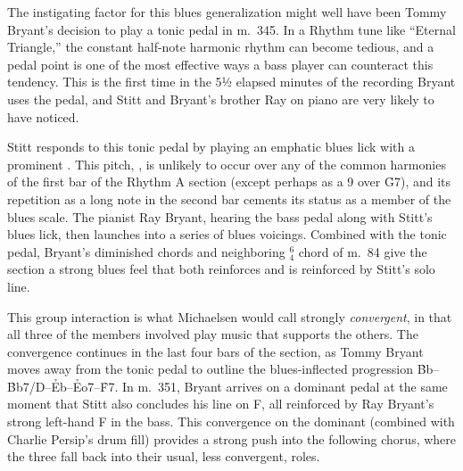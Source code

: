The instigating factor for this blues generalization might well have been
Tommy Bryant's decision to play a tonic pedal in m.~345. In a Rhythm tune like
``Eternal Triangle,'' the constant half-note harmonic rhythm can become
tedious, and a pedal point is one of the most effective ways a bass player can
counteract this tendency. This is the first time in the 5½ elapsed minutes of the
recording Bryant uses the pedal, and Stitt and Bryant's brother Ray on piano
are very likely to have noticed.

Stitt responds to this tonic pedal by playing an emphatic blues lick with a
prominent \Aflat. This pitch, \flat{}, is unlikely to occur over
any of the common harmonies of the first bar of the Rhythm A section (except
perhaps as a \flat{}9 over \h{G7}), and its repetition as a long note in the
second bar cements its status as a member of the \Bflat blues scale. The
pianist Ray Bryant, hearing the bass pedal along with Stitt's blues lick, then
launches into a series of blues voicings. Combined with the tonic pedal,
Bryant's diminished chords and neighboring $^6_4$ chord of m.~84 give the
section a strong blues feel that both reinforces and is reinforced by Stitt's
solo line.

This group interaction is what Michaelsen would call strongly
\emph{convergent}, in that all three of the members involved play music that
supports the others. The convergence continues in the last four bars
of the section, as Tommy Bryant moves away from the tonic pedal to outline the
blues-inflected progression \h{Bb}--\h{Bb7/D}--\h{Eb}--\h{Eo7}--\h{F7}. In
m.~351, Bryant arrives on a dominant pedal at the same moment that Stitt also
concludes his line on F, all reinforced by Ray Bryant's strong left-hand F in
the bass. This convergence on the dominant (combined with Charlie
Persip's drum fill) provides a strong push into the following chorus, where
the three fall back into their usual, less convergent, roles.

